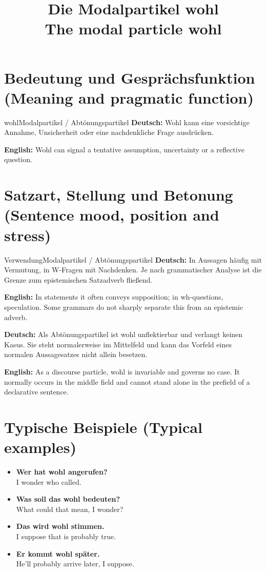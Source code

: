 \documentclass[a4paper,11pt]{article}
\title{Die Modalpartikel \glqq wohl\grqq\\{\large\textnormal{The modal particle wohl}}}
\date{}
\newcommand{\GermanText}[1]{\textbf{Deutsch: }#1\par}
\newcommand{\EnglishText}[1]{{\small\color{SoftGray}\textbf{English: }#1\par}}
\newcommand{\ExampleItem}[2]{\item \textbf{#1}\\{\small\color{SoftGray}#2}}
\begin{document}
\maketitle
\tableofcontents
\section{Bedeutung und Gesprächsfunktion \textnormal{(Meaning and pragmatic function)}}
\begin{grammarentry}{wohl}{Modalpartikel / Abtönungspartikel}
\GermanText{Wohl kann eine vorsichtige Annahme, Unsicherheit oder eine nachdenkliche Frage ausdrücken.}
\EnglishText{Wohl can signal a tentative assumption, uncertainty or a reflective question.}
\end{grammarentry}
\section{Satzart, Stellung und Betonung \textnormal{(Sentence mood, position and stress)}}
\begin{grammarentry}{Verwendung}{Modalpartikel / Abtönungspartikel}
\GermanText{In Aussagen häufig mit Vermutung, in W-Fragen mit Nachdenken. Je nach grammatischer Analyse ist die Grenze zum epistemischen Satzadverb fließend.}
\EnglishText{In statements it often conveys supposition; in wh-questions, speculation. Some grammars do not sharply separate this from an epistemic adverb.}
\end{grammarentry}
\GermanText{Als Abtönungspartikel ist wohl unflektierbar und verlangt keinen Kasus. Sie steht normalerweise im Mittelfeld und kann das Vorfeld eines normalen Aussagesatzes nicht allein besetzen.}
\EnglishText{As a discourse particle, wohl is invariable and governs no case. It normally occurs in the middle field and cannot stand alone in the prefield of a declarative sentence.}
\section{Typische Beispiele \textnormal{(Typical examples)}}
\begin{exbox}\begin{itemize}
\ExampleItem{Wer hat wohl angerufen?}{I wonder who called.}
\ExampleItem{Was soll das wohl bedeuten?}{What could that mean, I wonder?}
\ExampleItem{Das wird wohl stimmen.}{I suppose that is probably true.}
\ExampleItem{Er kommt wohl später.}{He'll probably arrive later, I suppose.}
\end{itemize}\end{exbox}
\end{document}
